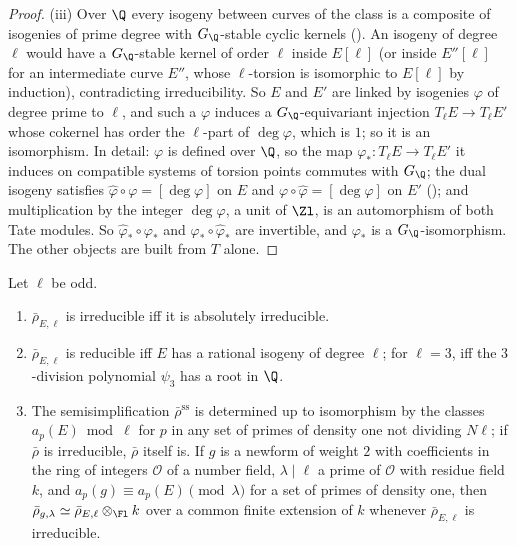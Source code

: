 \begin{proof}
(iii) Over $\Q$ every isogeny between curves of the class is a composite of isogenies of prime degree with $G_\Q$-stable cyclic kernels
(). An isogeny of degree $\ell$ would have a $G_\Q$-stable kernel of order $\ell$ inside $E[\ell]$ (or inside $E''[\ell]$ for an
intermediate curve $E''$, whose $\ell$-torsion is isomorphic to $E[\ell]$ by induction), contradicting irreducibility. So $E$ and $E'$ are linked
by isogenies $\varphi$ of degree prime to $\ell$, and such a $\varphi$ induces a $G_\Q$-equivariant injection $T_\ell E\to T_\ell E'$ whose cokernel has order the
$\ell$-part of $\deg\varphi$, which is $1$; so it is an isomorphism. In detail: $\varphi$ is defined over $\Q$, so the map $\varphi_*\colon T_\ell E\to T_\ell E'$ it induces on
compatible systems of torsion points commutes with $G_\Q$; the dual isogeny satisfies $\hat\varphi\circ\varphi=[\deg\varphi]$ on $E$ and $\varphi\circ\hat\varphi=[\deg\varphi]$ on $E'$
(); and multiplication by the integer $\deg\varphi$, a unit of $\Zl$, is an automorphism of both Tate modules. So $\hat\varphi_*\circ\varphi_*$ and
$\varphi_*\circ\hat\varphi_*$ are invertible, and $\varphi_*$ is a $G_\Q$-isomorphism. The other objects are built from $T$ alone.
\end{proof}

\begin{proposition}[irreducibility]\label{prop:galrep:irreducibility}
Let $\ell$ be odd.
\begin{enumerate}[label=(\roman*)]
\item $\bar\rho_{E,\ell}$ is irreducible iff it is absolutely irreducible.
\item $\bar\rho_{E,\ell}$ is reducible iff $E$ has a rational isogeny of degree $\ell$; for $\ell=3$, iff the $3$-division polynomial $\psi_3$ has a root
in $\Q$.
\item The semisimplification $\bar\rho^{\mathrm{ss}}$ is determined up to isomorphism by the classes $a_p(E)\bmod\ell$ for $p$ in any set of primes of
density one not dividing $N\ell$; if $\bar\rho$ is irreducible, $\bar\rho$ itself is. If $g$ is a newform of weight $2$ with coefficients in the ring of
integers $\mathcal O$ of a number field, $\lambda\mid\ell$ a prime of $\mathcal O$ with residue field $k$, and $a_p(g)\equiv a_p(E)\pmod\lambda$ for a set of
primes of density one, then $\bar\rho_{g,\lambda}\simeq\bar\rho_{E,\ell}\otimes_{\Fl}k$ over a common finite extension of $k$ whenever $\bar\rho_{E,\ell}$ is irreducible.
\end{enumerate}
\end{proposition}

